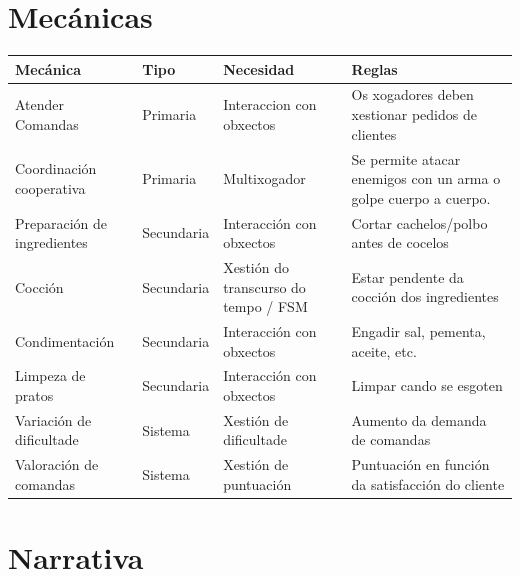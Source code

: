 \documentclass{report}  %
\begin{document}
\clearpage


\section{Mecánicas}

\begin{table}[h]
    \centering
    \renewcommand{\arraystretch}{1.3} %
    \setlength{\tabcolsep}{10pt} %
    \label{tab:mecanicas}
    \begin{tabular}{|p{4cm}|p{2cm}|p{3cm}|p{4cm}|}
        \hline
        \rowcolor{octopus} %
        \textbf{Mecánica}  & \textbf{Tipo} & \textbf{Necesidad} & \textbf{Reglas} \\
        \hline
        Atender Comandas & Primaria  & Interaccion con obxectos  & Os xogadores deben xestionar pedidos de clientes \\
        \hline
        Coordinación cooperativa & Primaria  & Multixogador    & Se permite atacar enemigos con un arma o golpe cuerpo a cuerpo. \\
        \hline
        Preparación de ingredientes  & Secundaria & Interacción con obxectos & Cortar cachelos/polbo antes de cocelos \\
        \hline
        Cocción & Secundaria & Xestión do transcurso do tempo / FSM & Estar pendente da cocción dos ingredientes \\
        \hline
        Condimentación & Secundaria & Interacción con obxectos & Engadir sal, pementa, aceite, etc. \\
        \hline
        Limpeza de pratos & Secundaria & Interacción con obxectos & Limpar cando se esgoten \\
        \hline
        Variación de dificultade  & Sistema & Xestión de dificultade & Aumento da demanda de comandas \\
        \hline
        Valoración de comandas & Sistema & Xestión de puntuación & Puntuación en función da satisfacción do cliente \\
        \hline

    \end{tabular}
\end{table}

\newpage
\section{Narrativa}
\end{document}
